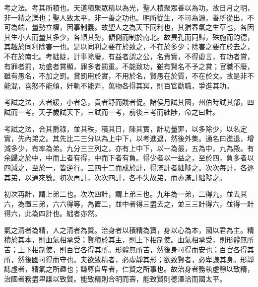 
考之法。考其所積也。天道積聚眾精以為光，聖人積聚眾善以為功。故日月之明，非一精之濼也；聖人致太平，非一善之功也。明所從生，不可為源，善所從出，不可為端，量勢立權，因事制義。故聖人之為天下同利也，其猶春氣之生草也，各因其生小大而量其多少，各順其勢，傾側而制於南北。故異孔而同歸，殊施而鈞德，其趣於同利除害一也。是以同利之要在於致之，不在於多少；除害之要在於去之，不在於南北。考絀陡，計事除廢，有益者謂之公，名責實，不得虛言，有功者賞，有罪者罰，功盛者賞顯，罪多者罰重。不能致功，雖有賢名不予之賞；官職不廢，雖有愚名，不加之罰。賞罰用於實，不用於名，賢愚在於質，不在於文。故是非不能混，喜怒不能傾，奸軌不能弄，萬物各得其冥，則百官勸職，爭進其功。

考試之法，大者緩，小者急，貴者舒而賤者促。諸侯月試其國，州伯時試其部，四試而一考。天子歲試天下，三試而一考，前後三考而絀陟，命之曰計。

考試之法，合其爵祿，並其秩，積其日，陳其實，計功量罪，以多除少，以名定實，先內弟之。其先比二三分以為上中下，以考進退，然後外集。通名曰進退，增減多少，有率為弟。九分三三列之，亦有上中下，以一為最，五為中，九為殿。有余歸之於中，中而上者有得，中而下者有負。得少者以一益之，至於四，負多者以四減之，至於一，皆逆行。三四十二而成於計，得滿計者絀陟之。次次每計，各逐其弟，以通來數。初次再計，次次四計，各不失故弟，而亦滿計絀陟之。

初次再計，謂上弟二也。次次四計，謂上弟三也。九年為一弟，二得九，並去其六，為置三弟，六六得等，為置二，並中者得三盡去之，並三三計得六，並得一計得六，此為四計也。絀者亦然。



氣之清者為精，人之清者為賢。治身者以積精為寶，身以心為本，國以君為主。精積於其本，則血氣相承受；賢積於其主，則上下相制使。血氣相承受，則形體無所苦；上下相制使，則百官各得其所。形體無所苦，然後身可得而安也；百官各得其所，然後國可得而守也。夫欲致精者，必虛靜其形；欲致賢者，必卑謙其身。形靜誌虛者，精氣之所趣也；謙尊自卑者，仁賢之所事也。故治身者務執虛靜以致精，治國者務盡卑謙以致賢。能致精則合明而壽，能致賢則德澤洽而國太平。


